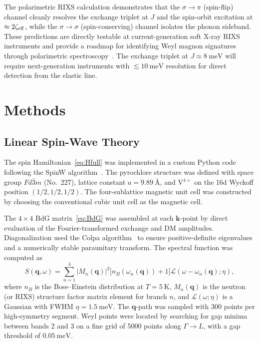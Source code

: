 \documentclass[aps,prb,twocolumn,superscriptaddress,longbibliography]{revtex4-2}
\begin{document}
The polarimetric RIXS calculation demonstrates that the $\sigma \to \pi$
(spin-flip) channel cleanly resolves the exchange triplet at $J$ and the
spin-orbit excitation at $\approx 2\zeta_{\rm eff}$, while the
$\sigma \to \sigma$ (spin-conserving) channel isolates the phonon sideband.
These predictions are directly testable at current-generation soft X-ray RIXS
instruments and provide a roadmap for identifying Weyl magnon signatures
through polarimetric spectroscopy~\cite{Ament2011,Haverkort2010}.
The exchange triplet at $J \approx \SI{8}{\milli\eV}$ will require
next-generation instruments with $\lesssim \SI{10}{\milli\eV}$ resolution
for direct detection from the elastic line.

\section{Methods}
\label{sec:methods}

\subsection{Linear Spin-Wave Theory}

The spin Hamiltonian~\eqref{eq:Hfull} was implemented in a custom Python
code following the SpinW algorithm~\cite{Toth2015}.
The pyrochlore structure was defined with space group $Fd\bar{3}m$ (No.~227),
lattice constant $a = \SI{9.89}{\angstrom}$, and V$^{4+}$ on the 16d
Wyckoff position $(1/2, 1/2, 1/2)$.
The four-sublattice magnetic unit cell was constructed by choosing the
conventional cubic unit cell as the magnetic cell.

The $4 \times 4$ BdG matrix~\eqref{eq:BdG} was assembled at each
$\bm{k}$-point by direct evaluation of the Fourier-transformed exchange and
DM amplitudes.
Diagonalization used the Colpa algorithm~\cite{Colpa1978} to ensure
positive-definite eigenvalues and a numerically stable paraunitary transform.
The spectral function was computed as
\begin{equation}
  S(\bm{q},\omega) = \sum_{n=1}^{4} |M_n(\bm{q})|^2
    \bigl[n_B(\omega_n(\bm{q})) + 1\bigr]
    \mathcal{L}(\omega - \omega_n(\bm{q}); \eta),
  \label{eq:Sqw}
\end{equation}
where $n_B$ is the Bose--Einstein distribution at $T = \SI{5}{\kelvin}$,
$M_n(\bm{q})$ is the neutron (or RIXS) structure factor matrix element for
branch $n$, and $\mathcal{L}(\omega;\eta)$ is a Gaussian with FWHM
$\eta = \SI{1.5}{\milli\eV}$.
The $\bm{q}$-path was sampled with 300 points per high-symmetry segment.
Weyl points were located by searching for gap minima between bands 2 and 3
on a fine grid of 5000 points along $\Gamma \to L$, with a gap threshold
of $\SI{0.05}{\milli\eV}$.
\end{document}
